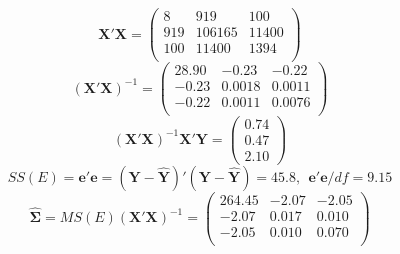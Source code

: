 \documentclass{report}
\begin{document}
$$\textbf{X}'\textbf{X}=\left(\begin{array}{rrr} 
8      &        919      &        100\\
919    &       106165    &        11400 \\
100    &        11400    &         1394  \\
\end{array}\right)$$ 
$$(\textbf{X}'\textbf{X})^{-1}=\left(\begin{array}{rrr} 
28.90  &   -0.23  &   -0.22  \\
-0.23  &   0.0018  &   0.0011  \\
-0.22  &   0.0011  &   0.0076  \\
\end{array}\right)$$
$$ (\textbf{X}'\textbf{X})^{-1} \textbf{X}'\textbf{Y} = \left(\begin{array}{r} 0.74 \\ 0.47 \\ 2.10
\end{array}\right)$$
$$ SS(E) = \textbf{e}'\textbf{e} = (\textbf{Y}-\hat{\textbf{Y}})'(\textbf{Y}-\hat{\textbf{Y}}) = 45.8, \ \  \textbf{e}'\textbf{e}/df = 9.15$$
\bigkn
$$ \widehat{\boldsymbol{\Sigma}} = MS(E) (\textbf{X}'\textbf{X})^{-1} = \left(\begin{array}{rrr} 
264.45  &   -2.07   &  -2.05 \\
-2.07  &    0.017   &   0.010 \\
-2.05  &    0.010   &  0.070 \\
\end{array}\right)$$

\newpage
\end{document}
